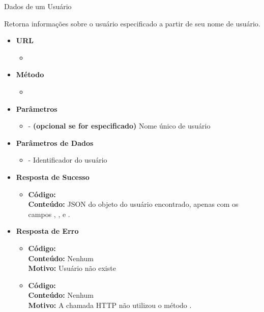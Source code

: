 
\begin{caixa}{Dados de um Usuário}{}

Retorna informações sobre o usuário especificado a partir de seu nome de usuário.

\begin{itemize}
\item \textbf{URL}
	\begin{itemize}
		\item {}
	\end{itemize}

\item \textbf{Método}
	\begin{itemize}
		\item {}
	\end{itemize}

\item \textbf{Parâmetros}
	\begin{itemize}
		\item {} - \textbf{(opcional se  for especificado)} Nome único de usuário
	\end{itemize}

\item \textbf{Parâmetros de Dados}
	\begin{itemize}
		\item {} - Identificador do usuário
	\end{itemize}

\item \textbf{Resposta de Sucesso}
	\begin{itemize}
		\item \textbf{Código:}  \\ \textbf{Conteúdo:} JSON do objeto  do usuário encontrado, apenas com os campos , ,  e .
	\end{itemize}

\item \textbf{Resposta de Erro}
	\begin{itemize}
		\item \textbf{Código:}  \\ \textbf{Conteúdo:} Nenhum \\ \textbf{Motivo:} Usuário não existe
        \item \textbf{Código:}  \\ \textbf{Conteúdo:} Nenhum \\ \textbf{Motivo:} A chamada HTTP não utilizou o método .
	\end{itemize}

\end{itemize}
\end{caixa}

